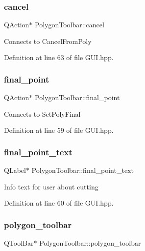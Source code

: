 \subsubsection{\texorpdfstring{cancel}{cancel}}
{\footnotesize\ttfamily Q\+Action$\ast$ Polygon\+Toolbar\+::cancel}

Connects to Cancel\+From\+Poly 

Definition at line 63 of file G\+U\+I.\+hpp.

\mbox{\label{structPolygonToolbar_a25d471a6081bfa4107d5f1cd9a61d243}} 
\subsubsection{\texorpdfstring{final\+\_\+point}{final\_point}}
{\footnotesize\ttfamily Q\+Action$\ast$ Polygon\+Toolbar\+::final\+\_\+point}

Connects to Set\+Poly\+Final 

Definition at line 59 of file G\+U\+I.\+hpp.

\mbox{\label{structPolygonToolbar_a3af92f094b85ad63be4d9dcf37a88fa8}} 
\subsubsection{\texorpdfstring{final\+\_\+point\+\_\+text}{final\_point\_text}}
{\footnotesize\ttfamily Q\+Label$\ast$ Polygon\+Toolbar\+::final\+\_\+point\+\_\+text}

Info text for user about cutting 

Definition at line 60 of file G\+U\+I.\+hpp.

\mbox{\label{structPolygonToolbar_a5388c77217c5bea7075cf234c508b8d6}} 
\subsubsection{\texorpdfstring{polygon\+\_\+toolbar}{polygon\_toolbar}}
{\footnotesize\ttfamily Q\+Tool\+Bar$\ast$ Polygon\+Toolbar\+::polygon\+\_\+toolbar}

